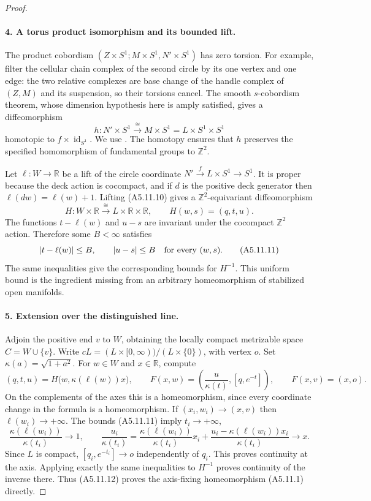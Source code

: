 \begin{proof}
\paragraph{4. A torus product isomorphism and its bounded lift.}
The product cobordism $(Z\times S^1;M\times S^1,N'\times S^1)$
has zero torsion.  For example, filter the cellular chain complex
of the second circle by its one vertex and one edge: the two
relative complexes are base change of the handle complex of
$(Z,M)$ and its suspension, so their torsions cancel.
The smooth $s$-cobordism theorem, whose dimension hypothesis here
is amply satisfied, gives a diffeomorphism
\[
 h:N'\times S^1\xrightarrow{\cong}M\times S^1
                      =L\times S^1\times S^1             \tag{A5.11.10}
\]
homotopic to $f\times\operatorname{id}_{S^1}$.
We use \cite[\S10, $s$-Cobordism Theorem, p.393]{A5-Milnor1966}.
The homotopy ensures that $h$ preserves the specified homomorphism
of fundamental groups to $\mathbb Z^2$.

Let $\ell:W\to\mathbb R$ be a lift of the circle coordinate
$N'\xrightarrow f L\times S^1\to S^1$.
It is proper because the deck action is cocompact, and if $d$ is
the positive deck generator then $\ell(dw)=\ell(w)+1$.
Lifting (A5.11.10) gives a $\mathbb Z^2$-equivariant diffeomorphism
\[
 H:W\times\mathbb R\xrightarrow{\cong}
                   L\times\mathbb R\times\mathbb R,
 \qquad H(w,s)=(q,t,u).
\]
The functions $t-\ell(w)$ and $u-s$ are invariant under the
cocompact $\mathbb Z^2$ action.  Therefore some $B<\infty$ satisfies
\[
 |t-\ell(w)|\le B,\qquad |u-s|\le B
                         \quad\hbox{for every }(w,s).    \tag{A5.11.11}
\]
The same inequalities give the corresponding bounds for $H^{-1}$.
This uniform bound is the ingredient missing from an arbitrary
homeomorphism of stabilized open manifolds.

\paragraph{5. Extension over the distinguished line.}
Adjoin the positive end $v$ to $W$, obtaining the locally compact
metrizable space $C=W\cup\{v\}$.  Write
$cL=(L\times[0,\infty))/(L\times\{0\})$, with vertex $o$.
Set $\kappa(a)=\sqrt{1+a^2}$.  For $w\in W$ and $x\in\mathbb R$,
compute
\[
 (q,t,u)=H\bigl(w,\kappa(\ell(w))x\bigr),
 \qquad
 F(x,w)=\left(\frac{u}{\kappa(t)},[q,e^{-t}]\right),
 \qquad F(x,v)=(x,o).                                   \tag{A5.11.12}
\]
On the complements of the axes this is a homeomorphism, since
every coordinate change in the formula is a homeomorphism.
If $(x_i,w_i)\to(x,v)$ then $\ell(w_i)\to+\infty$.
The bounds (A5.11.11) imply $t_i\to+\infty$,
\[
 \frac{\kappa(\ell(w_i))}{\kappa(t_i)}\longrightarrow1,
 \qquad
 \frac{u_i}{\kappa(t_i)}
 =\frac{\kappa(\ell(w_i))}{\kappa(t_i)}x_i
       +\frac{u_i-\kappa(\ell(w_i))x_i}{\kappa(t_i)}
 \longrightarrow x.
\]
Since $L$ is compact, $[q_i,e^{-t_i}]\to o$ independently of
$q_i$.  This proves continuity at the axis.  Applying exactly the
same inequalities to $H^{-1}$ proves continuity of the inverse
there.  Thus (A5.11.12) proves the axis-fixing homeomorphism
(A5.11.1) directly.


\end{proof}
